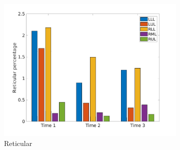 \begin{figure}[H]
\begin{subfigure}{.46\linewidth}%
  \includegraphics[width=\linewidth,trim={{.0\wd0} {.0\wd0} {.0\wd0} {.0\wd0}},clip]{QuantitativeAnalysis/Image/IPF15ReticularLobarRegionDiseaseDistributionOverTime.jpg}
  \caption{Reticular}
  \label{fig:IPF15LobarRegionDiseaseDistributionOverTimeMain-b}
\end{subfigure}
\begin{subfigure}{.46\linewidth}%

\end{subfigure}
\end{figure}
